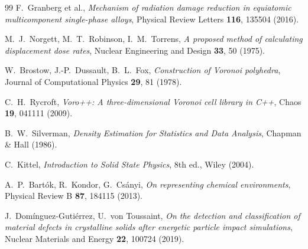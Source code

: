\documentclass[11pt,a4paper]{article}
\theoremstyle{remark}
\begin{document}
\begin{thebibliography}{99}
F.~Granberg et al.,
\textit{Mechanism of radiation damage reduction in equiatomic
multicomponent single-phase alloys},
Physical Review Letters \textbf{116}, 135504 (2016).

M.~J.~Norgett, M.~T.~Robinson, I.~M.~Torrens,
\textit{A proposed method of calculating displacement dose rates},
Nuclear Engineering and Design \textbf{33}, 50 (1975).

W.~Brostow, J.-P.~Dussault, B.~L.~Fox,
\textit{Construction of Voronoi polyhedra},
Journal of Computational Physics \textbf{29}, 81 (1978).

C.~H.~Rycroft,
\textit{Voro++: A three-dimensional Voronoi cell library in C++},
Chaos \textbf{19}, 041111 (2009).

B.~W.~Silverman,
\textit{Density Estimation for Statistics and Data Analysis},
Chapman \& Hall (1986).

C.~Kittel,
\textit{Introduction to Solid State Physics},
8th ed., Wiley (2004).

A.~P.~Bartók, R.~Kondor, G.~Csányi,
\textit{On representing chemical environments},
Physical Review B \textbf{87}, 184115 (2013).

J.~Domínguez-Gutiérrez, U.~von Toussaint,
\textit{On the detection and classification of material defects in
crystalline solids after energetic particle impact simulations},
Nuclear Materials and Energy \textbf{22}, 100724 (2019).

\end{thebibliography}
\end{document}
